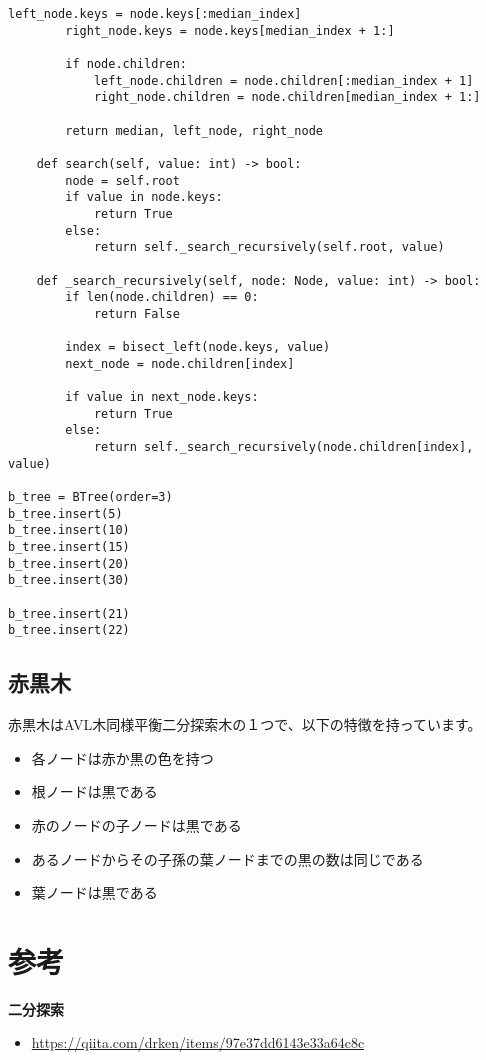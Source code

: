 \documentclass{jlreq}
\begin{document}
\begin{lstlisting}[caption=B木の実装, label=btree, frame=TRBL, label={btree}]
        left_node.keys = node.keys[:median_index]
        right_node.keys = node.keys[median_index + 1:]

        if node.children:
            left_node.children = node.children[:median_index + 1]
            right_node.children = node.children[median_index + 1:]

        return median, left_node, right_node

    def search(self, value: int) -> bool:
        node = self.root
        if value in node.keys:
            return True
        else:
            return self._search_recursively(self.root, value)
    
    def _search_recursively(self, node: Node, value: int) -> bool:
        if len(node.children) == 0:
            return False
        
        index = bisect_left(node.keys, value)
        next_node = node.children[index]
        
        if value in next_node.keys:
            return True
        else:
            return self._search_recursively(node.children[index], value)

b_tree = BTree(order=3)
b_tree.insert(5)
b_tree.insert(10)
b_tree.insert(15)
b_tree.insert(20)
b_tree.insert(30)

b_tree.insert(21)
b_tree.insert(22)
\end{lstlisting}

\newpage

\subsection{赤黒木}
赤黒木はAVL木同様平衡二分探索木の１つで、以下の特徴を持っています。

\begin{itemize}
  \item 各ノードは赤か黒の色を持つ
  \item 根ノードは黒である
  \item 赤のノードの子ノードは黒である
  \item あるノードからその子孫の葉ノードまでの黒の数は同じである
  \item 葉ノードは黒である
\end{itemize}


\section{参考}
\textbf{二分探索}

\begin{itemize}
  \item \url{https://qiita.com/drken/items/97e37dd6143e33a64c8c}
\end{itemize}
\end{document}
